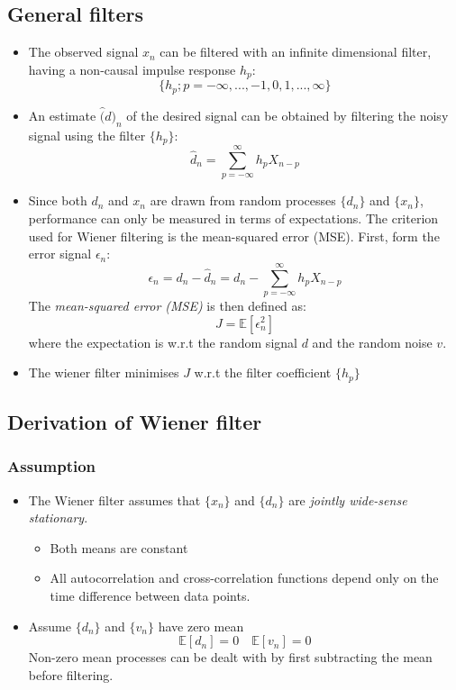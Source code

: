 \documentclass[12pt]{article}
\newcommand{\titc}[1]{\textit{\textcolor{blue1}{#1}}}
\newcommand{\mexp}{\mathbb{E}}
\newcommand{\summ}[2]{\sum_{#1}^{#2}}
\newcommand{\sumpinfinf}{\summ{p=-\infty}{\infty}}
\newcommand{\proc}[1]{\{ #1_n\}}
\newcommand{\desest}{\hat{d}_n}
\newcommand{\des}{d_n}
\newcommand{\err}{\epsilon_n}
\begin{document}
\subsection{General filters}
\begin{itemize}
 \item The observed signal $x_n$ can be filtered with an infinite dimensional filter, having a non-causal impulse response $h_p$:
\[
\{ h_p; p=-\infty,...,-1,0,1,...,\infty \}
\]
\item An estimate $\hat(d)_n$ of the desired signal can be obtained by filtering the noisy signal using the filter $\{ h_p\}$:
\[
\desest = \sumpinfinf h_p X_{n-p}
\]

\item Since both $\des$ and $x_n$ are drawn from random processes $\proc{d}$ and $\proc{x}$, performance can only be measured in terms of expectations. The criterion used for Wiener filtering is the mean-squared error (MSE). First, form the error signal $\err$:
\[
\err = \des - \desest = \des -  \sumpinfinf h_p X_{n-p}
\]
The \titc{mean-squared error (MSE)} is then defined as:
\begin{equation}
    J = \mexp[\err^2]
    \label{eq:MSE}
\end{equation}
where the expectation is w.r.t the random signal $d$ and the random noise $v$.
\item The wiener filter minimises $J$ w.r.t the filter coefficient $\{ h_p\}$
\end{itemize}

\subsection{Derivation of Wiener filter}
\subsubsection{Assumption}
\begin{itemize}
    \item The Wiener filter assumes that $\proc{x}$ and $\proc{d}$ are \titc{jointly wide-sense stationary}. 
    \begin{itemize}
        \item Both means are constant 
        \item All autocorrelation and cross-correlation functions depend only on the time difference between data points.
    \end{itemize}
    \item  Assume $\proc{d}$ and $\proc{v}$ have zero mean 
    \[
    \mexp[d_n]=0 \quad \mexp[v_n] = 0
    \]
    Non-zero mean processes can be dealt with by first subtracting the mean before filtering.
\end{itemize}
\end{document}
